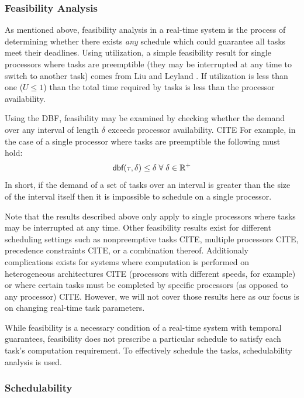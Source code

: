 \subsubsection{Feasibility Analysis}

As mentioned above, feasibility analysis in a real-time system is the process of determining whether there exists \textit{any} schedule which could guarantee all tasks meet their deadlines.
Using utilization, a simple feasibility result for single processors where tasks are preemptible (they may be interrupted at any time to switch to another task) comes from Liu and Leyland \cite{liu_scheduling_1973}.
If utilization is less than one ($U \leq 1$) than the total time required by tasks is less than the processor availability.

Using the DBF, feasibility may be examined by checking whether the demand over any interval of length $\delta$ exceeds processor availability. CITE
For example, in the case of a single processor where tasks are preemptible the following must hold:
\begin{equation}
    \mbox{\sf dbf}(\tau,\delta) \leq \delta \; \forall \; \delta \in \mathbb{R}^+
\end{equation}
In short, if the demand of a set of tasks over an interval is greater than the size of the interval itself then it is impossible to schedule on a single processor.

Note that the results described above only apply to single processors where tasks may be interrupted at any time.
Other feasibility results exist for different scheduling settings such as nonpreemptive tasks CITE, multiple processors CITE, precedence constraints CITE, or a combination thereof.
Additionaly complications exists for systems where computation is performed on heterogeneous architectures CITE (processors with different speeds, for example) or where certain tasks must be completed by specific processors (as opposed to any processor) CITE. 
However, we will not cover those results here as our focus is on changing real-time task parameters.

While feasibility is a necessary condition of a real-time system with temporal guarantees, feasibility does not prescribe a particular schedule to satisfy each task's computation requirement.
To effectively schedule the tasks, schedulability analysis is used.

\subsubsection{Schedulability}

